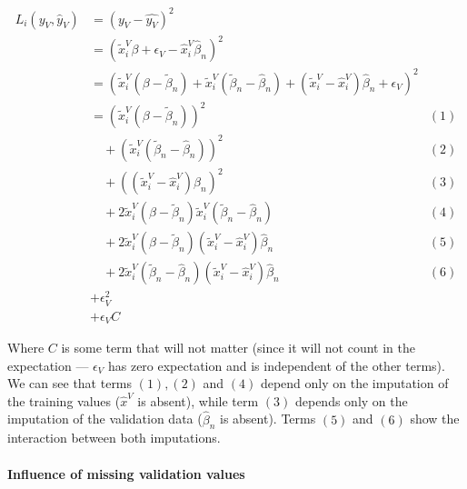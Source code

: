 \begin{align*}
L_i(y_V, \hat{y}_V) &= (y_V - \hat{y_V})^2 &\\
				   &= (\tilde{x}_i^V \beta + \epsilon_V - \hat{x}_i^V \hat{\beta}_n)^2 &\\
				   &= (\tilde{x}_i^V(\beta - \tilde{\beta}_n) + \tilde{x}_i^V (\tilde{\beta}_n - \hat{\beta}_n) + (\tilde{x}_i^V - \hat{x}_i^V) \hat{\beta}_n + \epsilon_V)^2 & \\
				   &= (\tilde{x}_i^V (\beta - \tilde{\beta}_n))^2 & (1) \\
				   & \quad + (\tilde{x}_i^V (\tilde{\beta}_n-\hat{\beta}_n))^2 &(2) \\
				   & \quad + ((\tilde{x}_i^V - \hat{x}_i^V) \hat{\beta}_n)^2 &(3) \\
				   & \quad +2 \tilde{x}_i^V (\beta - \tilde{\beta}_n) \tilde{x}_i^V (\tilde{\beta}_n - \hat{\beta}_n) & (4) \\
				   & \quad +2 \tilde{x}_i^V (\beta - \tilde{\beta}_n) (\tilde{x}_i^V - \hat{x}_i^V )\hat{\beta}_n & (5) \\
				   & \quad +2 \tilde{x}_i^V (\tilde{\beta}_n - \hat{\beta}_n) (\tilde{x}_i^V - \hat{x}_i^V) \hat{\beta}_n & (6)\\
				   & + \epsilon_V^2 &\\
				   & + \epsilon_V C
\end{align*}

Where $C$ is some term that will not matter (since it will not count in the expectation --- $\epsilon_V$ has zero expectation and is independent of the other terms). We can see that terms $(1), (2)$ and $(4)$ depend only on the imputation of the training values ($\hat{x}^V$ is absent), while term $(3)$ depends only on the imputation of the validation data ($\hat{\beta}_n$ is absent). Terms $(5)$ and $(6)$ show the interaction between both imputations.

\paragraph{Influence of missing validation values}

